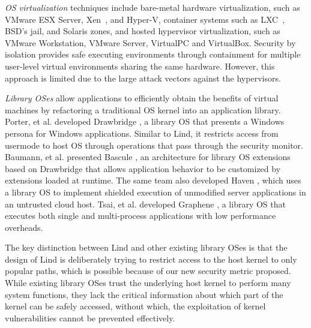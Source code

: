 \textit{OS virtualization}
techniques include
bare-metal hardware virtualization, such as VMware ESX Server, Xen~\cite{Xen-03},
and Hyper-V, container systems such as LXC~\cite{LXC}, BSD's jail, and Solaris zones, and
hosted hypervisor virtualization, such as VMware
Workstation, VMware Server, VirtualPC and VirtualBox.
Security by isolation \cite{Qubes, Overshadow, SecureVM, HypSec}
provides safe executing environments through containment for multiple
user-level virtual environments sharing the same hardware.
However, this approach is limited due to
the large attack vectors against the hypervisors.

\textit{Library OSes}
allow applications to efficiently obtain the benefits of virtual machines
by refactoring a traditional OS kernel into an application library.
Porter, et al. developed Drawbridge \cite{Drawbridge-11},
a library OS
that presents a Windows persona for %
Windows applications. Similar to Lind,
it restricts access from usermode to host OS through
operations that pass through the security monitor.
%
%
Baumann, et al. presented Bascule \cite{Bascule}, an architecture for library OS extensions
based on Drawbridge that allows application behavior to be customized by
extensions loaded at runtime. The same team also developed Haven \cite{Haven},
which uses a library OS to implement
shielded execution of unmodified server applications
in an untrusted cloud host.
Tsai, et al. developed Graphene \cite{Graphene-14}, a library OS that
executes both single and
multi-process applications with low performance overheads.

The key distinction between Lind and other existing library OSes is that the design of Lind 
is deliberately trying to restrict access to the host kernel to only popular paths, which is possible 
because of our new security metric proposed. While existing library OSes trust the underlying host kernel to perform many system functions, 
they lack the critical information about which part of the kernel can be safely accessed, without which, the exploitation of kernel vulnerabilities 
cannot be prevented effectively. 

